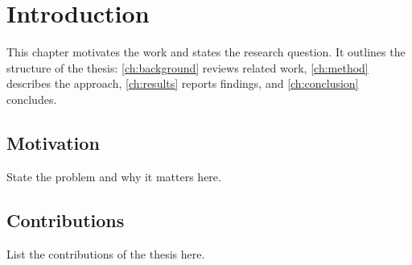 \chapter{Introduction}
\label{ch:introduction}

This chapter motivates the work and states the research question. It outlines the
structure of the thesis: \cref{ch:background} reviews related work, \cref{ch:method}
describes the approach, \cref{ch:results} reports findings, and \cref{ch:conclusion}
concludes.

\section{Motivation}
\label{sec:motivation}

State the problem and why it matters here.

\section{Contributions}
\label{sec:contributions}

List the contributions of the thesis here.
